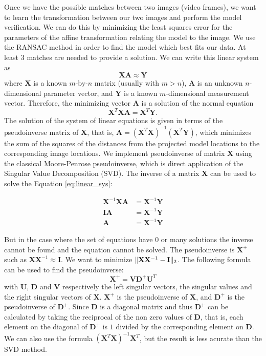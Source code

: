 \documentclass[]{IEEEtran}
\DeclarePairedDelimiter{\norm}{\lVert}{\rVert}
\begin{document}
  Once we have the possible matches between two images (video frames), we want to learn the transformation between our two images and perform the model verification. We can do this by minimizing the least squares error for the parameters of the affine transformation relating the model to the image. We use the RANSAC\cite{ransac} method in order to find the model which best fits our data. At least 3 matches are needed to provide a solution. We can write this linear system as
  \begin{equation} \label{eq:linear_sys}
  \mathbf{XA} \approx \mathbf{Y}
  \end{equation}
  where $\mathbf{X}$ is a known $m$-by-$n$ matrix (usually with $m > n$), $\mathbf{A}$ is an unknown $n$-dimensional parameter vector, and $\mathbf{Y}$ is a known $m$-dimensional measurement vector. Therefore, the minimizing vector $\mathbf{A}$  is a solution of the normal equation
  $$
  \mathbf{X}^T\mathbf{X}\mathbf{A} = \mathbf{X}^T\mathbf{Y}.
  $$
  The solution of the system of linear equations is given in terms of the pseudoinverse matrix of $\mathbf{X}$, that is, $\mathbf{A} = (\mathbf{X}^T\mathbf{X})^{-1}(\mathbf{X}^T\mathbf{Y})$, which minimizes the sum of the squares of the distances from the projected model locations to the corresponding image locations.
  We implement pseudoinverse of matrix $\mathbf{X}$ using the classical Moore-Penrose pseudoinverse\cite{moore_penrose}, which is direct application of the Singular Value Decomposition (SVD). The inverse of a matrix $\mathbf{X}$ can be used to solve the Equation \ref{eq:linear_sys}:
 \begin{ceqn}
 \begin{align}
   \label{eq:linear_solve}
   \mathbf{X}^{-1}\mathbf{X}\mathbf{A} &= \mathbf{X}^{-1}\mathbf{Y}\\
   \mathbf{I}\mathbf{A} &= \mathbf{X}^{-1}\mathbf{Y}\\
   \mathbf{A} &= \mathbf{X}^{-1}\mathbf{Y}
 \end{align}
 \end{ceqn}
  But in the case where the set of equations have $0$ or many solutions the inverse cannot be found and the equation cannot be solved. The pseudoinverse is $\mathbf{X}^+$ such as $\mathbf{X}\mathbf{X}^{-1} \approx \mathbf{I}$. We want to minimize $\norm{\mathbf{X}\mathbf{X}^{-1} - \mathbf{I}}_2$. The following formula can be used to find the pseudoinverse:
  $$
  \mathbf{X}^+ = \mathbf{V}\mathbf{D}^+\mathbf{U}^T
  $$
  with $\mathbf{U}$, $\mathbf{D}$ and $\mathbf{V}$ respectively the left singular vectors, the singular values and the right singular vectors of $\mathbf{X}$. $\mathbf{X}^+$ is the pseudoinverse of $\mathbf{X}$, and $\mathbf{D}^+$ is the pseudoinverse of $\mathbf{D}^+$. Since $\mathbf{D}$ is a diagonal matrix and thus $\mathbf{D}^+$ can be calculated by taking the reciprocal of the non zero values of $\mathbf{D}$, that is, each element on the diagonal of $\mathbf{D}^+$ is $1$ divided by the corresponding element on $\mathbf{D}$. We can also use the formula $(\mathbf{X}^T\mathbf{X})^{-1}\mathbf{X}^T$, but the result is less acurate than the SVD method\cite{moore_pen_site}.
\end{document}
